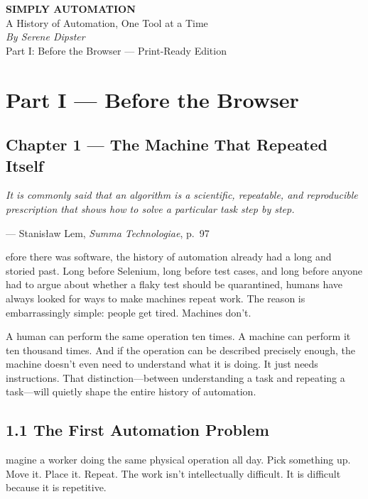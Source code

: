 \documentclass[11pt, a4paper, openany]{book}
\newcommand{\initialcap}[1]{{\fontfamily{lmss}\selectfont\huge\textbf{#1}}}
\providecommand{\epigraphlem}[2]{%
  \begin{flushright}\begin{minipage}{0.72\textwidth}\raggedleft
  \itshape #1\par\vspace{0.4em}\normalfont\small --- #2
  \end{minipage}\end{flushright}\vspace{1.2em}}
\begin{document}
\frontmatter
\begin{titlepage}
\centering
\vspace*{4cm}
{\Huge\bfseries\sffamily SIMPLY AUTOMATION}\\[1.5cm]
{\Large\sffamily A History of Automation, One Tool at a Time}\\[2cm]
{\large\itshape By Serene Dipster}\\[3cm]
\vfill
{\small Part I: Before the Browser --- Print-Ready Edition}
\end{titlepage}

\mainmatter

\chapter*{Part I --- Before the Browser}

\section*{Chapter 1 --- The Machine That Repeated Itself}

\epigraphlem{It is commonly said that an algorithm is a scientific, repeatable, and reproducible prescription that shows how to solve a particular task step by step.}{Stanisław Lem, \textit{Summa Technologiae}, p.~97}


\noindent \initialcap{B}efore there was software, the history of automation already had a long and storied past. Long before Selenium, long before test cases, and long before anyone had to argue about whether a flaky test should be quarantined, humans have always looked for ways to make machines repeat work. The reason is embarrassingly simple: people get tired. Machines don't.

A human can perform the same operation ten times. A machine can perform it ten thousand times. And if the operation can be described precisely enough, the machine doesn't even need to understand what it is doing. It just needs instructions. That distinction---between understanding a task and repeating a task---will quietly shape the entire history of automation.

\section{1.1 The First Automation Problem}
\noindent \initialcap{I}magine a worker doing the same physical operation all day. Pick something up. Move it. Place it. Repeat. The work isn't intellectually difficult. It is difficult because it is repetitive.
\end{document}
